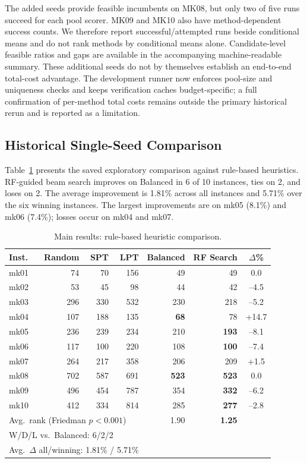 \documentclass[12pt]{article}
\begin{document}
The added seeds provide feasible incumbents on MK08, but only two of five runs succeed for each pool scorer. MK09 and MK10 also have method-dependent success counts. We therefore report successful/attempted runs beside conditional means and do not rank methods by conditional means alone. Candidate-level feasible ratios and gaps are available in the accompanying machine-readable summary. These additional seeds do not by themselves establish an end-to-end total-cost advantage. The development runner now enforces pool-size and uniqueness checks and keeps verification caches budget-specific; a full confirmation of per-method total costs remains outside the primary historical rerun and is reported as a limitation.



\subsection{Historical Single-Seed Comparison}

Table~\ref{tab:main} presents the saved exploratory comparison against rule-based heuristics. RF-guided beam search improves on Balanced in 6 of 10 instances, ties on 2, and loses on 2. The average improvement is 1.81\% across all instances and 5.71\% over the six winning instances. The largest improvements are on mk05 (8.1\%) and mk06 (7.4\%); losses occur on mk04 and mk07.

\begin{table}[htbp]\centering\caption{Main results: rule-based heuristic comparison.}\label{tab:main}
\begin{tabular}{lrrrrrc}\toprule
Inst. & Random & SPT & LPT & Balanced & RF Search & $\Delta$\% \\ \midrule
mk01 & 74 & 70 & 156 & 49 & 49 & 0.0 \\
mk02 & 53 & 45 & 98 & 44 & 42 & --4.5 \\
mk03 & 296 & 330 & 532 & 230 & 218 & --5.2 \\
mk04 & 107 & 188 & 135 & \textbf{68} & 78 & +14.7 \\
mk05 & 236 & 239 & 234 & 210 & \textbf{193} & --8.1 \\
mk06 & 117 & 100 & 220 & 108 & \textbf{100} & --7.4 \\
mk07 & 264 & 217 & 358 & 206 & 209 & +1.5 \\
mk08 & 702 & 587 & 691 & \textbf{523} & \textbf{523} & 0.0 \\
mk09 & 496 & 454 & 787 & 354 & \textbf{332} & --6.2 \\
mk10 & 412 & 334 & 814 & 285 & \textbf{277} & --2.8 \\ \midrule
\multicolumn{4}{l}{Avg.\ rank (Friedman $p<0.001$)} & 1.90 & \textbf{1.25} \\
\multicolumn{4}{l}{W/D/L vs.\ Balanced: 6/2/2} \\
\multicolumn{4}{l}{Avg.\ $\Delta$ all/winning: 1.81\% / 5.71\%} \\ \bottomrule
\end{tabular}
\end{table}
\end{document}
